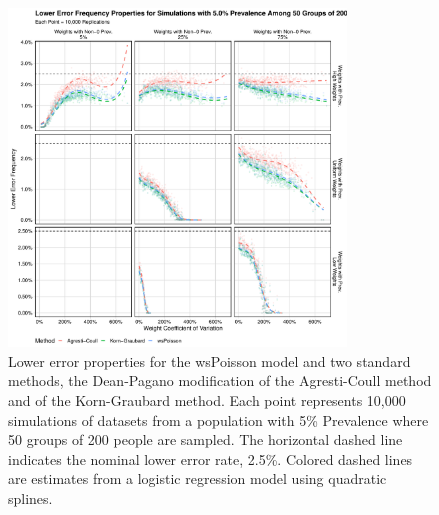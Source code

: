 \documentclass[AMA,STIX1COL]{WileyNJD-v2}
\begin{document}
\begin{figure}
\centering
\includegraphics[width=0.8\textwidth]{figures/perfect_lower_error_frequency_50_groups_0_05_prev.pdf}
\caption{Lower error properties for the wsPoisson model and two standard methods, the Dean-Pagano modification of the Agresti-Coull method and of the Korn-Graubard method.
Each point represents 10,000 simulations of datasets from a population with 5\% Prevalence where 50 groups of 200 people are sampled.
The horizontal dashed line indicates the nominal lower error rate, 2.5\%.
Colored dashed lines are estimates from a logistic regression model using quadratic splines.}
\label{fig:perfect_lower_error_frequency_50_groups_0_05_prev}
\end{figure}
\end{document}
